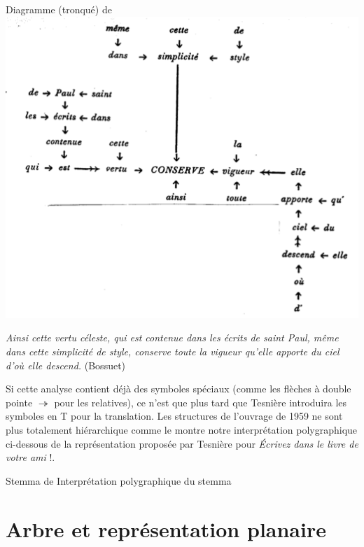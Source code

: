 {    \ea
    Diagramme (tronqué) de \citet{Tesnière1934}
    \includegraphics[width=\textwidth]{figures/vol1syntaxe2-img017.png}

    \textit{Ainsi cette vertu céleste, qui est contenue dans les écrits de saint Paul, même dans cette simplicité de style, conserve toute la vigueur qu’elle apporte du ciel d’où elle descend.} (Bossuet)
    \z

    Si cette analyse contient déjà des symboles spéciaux (comme les flèches à double pointe \textrm{$\twoheadrightarrow $} pour les relatives), ce n’est que plus tard que Tesnière introduira les symboles en T pour la translation. Les structures de l’ouvrage de 1959 ne sont plus totalement hiérarchique comme le montre notre interprétation polygraphique ci-dessous de la représentation proposée par Tesnière pour \textit{Écrivez dans le livre de votre ami} !.

    \ea

        Stemma de \citet{Tesnière1959}                 Interprétation polygraphique du stemma

    \z
}
\section{Arbre et représentation planaire}\label{sec:3.3.6}

